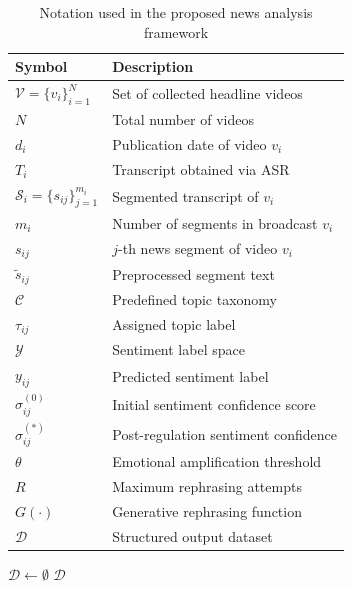 \documentclass[final,1p,times]{elsarticle}
\begin{document}
\begin{table}[H]
\centering
\caption{Notation used in the proposed news analysis framework}
\label{tab:notation}
\small
\setlength{\tabcolsep}{3pt}
\renewcommand{\arraystretch}{1.08}
\begin{tabular}{p{3.7cm} p{5.9cm}}
\hline
\textbf{Symbol} & \textbf{Description} \\
\hline
$\mathcal{V}=\{v_i\}_{i=1}^{N}$ & Set of collected headline videos \\
$N$ & Total number of videos \\
$d_i$ & Publication date of video $v_i$ \\
$T_i$ & Transcript obtained via ASR \\
$\mathcal{S}_i=\{s_{ij}\}_{j=1}^{m_i}$ & Segmented transcript of $v_i$ \\
$m_i$ & Number of segments in broadcast $v_i$ \\
$s_{ij}$ & $j$-th news segment of video $v_i$ \\
$\tilde{s}_{ij}$ & Preprocessed segment text \\
$\mathcal{C}$ & Predefined topic taxonomy \\
$\tau_{ij}$ & Assigned topic label \\
$\mathcal{Y}$ & Sentiment label space \\
$y_{ij}$ & Predicted sentiment label \\
$\sigma^{(0)}_{ij}$ & Initial sentiment confidence score \\
$\sigma^{(*)}_{ij}$ & Post-regulation sentiment confidence \\
$\theta$ & Emotional amplification threshold \\
$R$ & Maximum rephrasing attempts \\
$G(\cdot)$ & Generative rephrasing function \\
$\mathcal{D}$ & Structured output dataset \\
\hline
\end{tabular}
\end{table}

\begin{algorithm}[H]
\caption{End-to-end daily news analysis and dataset construction}
\label{alg:pipeline}
$\mathcal{D}\leftarrow \emptyset$\;
\Return $\mathcal{D}$\;
\end{algorithm}
\end{document}
